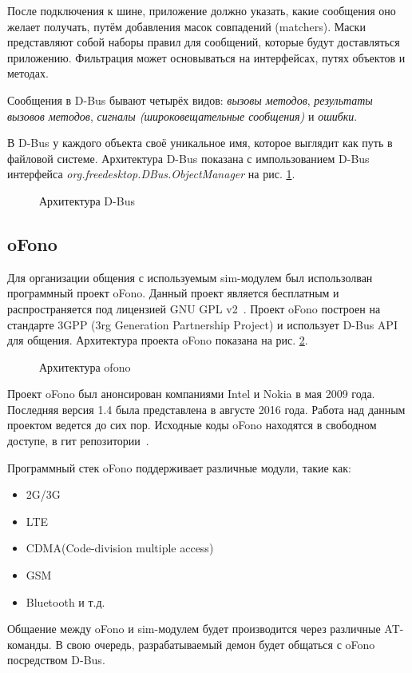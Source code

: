 После подключения к шине, приложение должно указать, какие сообщения оно желает получать, путём добавления масок совпадений (matchers). Маски представляют собой наборы правил для сообщений, которые будут доставляться приложению. Фильтрация может основываться на интерфейсах, путях объектов и методах.

Сообщения в D-Bus бывают четырёх видов: \textit{вызовы методов}, \textit{результаты вызовов методов}, \textit{сигналы (широковещательные сообщения)} и \textit{ошибки}.

В D-Bus у каждого объекта своё уникальное имя, которое выглядит как путь в файловой системе. Архитектура D-Bus показана с импользованием D-Bus интерфейса \textit{org.freedesktop.DBus.ObjectManager} на рис. \ref{fig:dbus}.
\begin{figure}[H]
\caption{Архитектура D-Bus}
\label{fig:dbus}
\end{figure}
\subsection{oFono}
Для организации общения с используемым sim-модулем был использолван программный проект oFono. Данный проект является бесплатным и распространяется под лицензией GNU GPL v2~\cite{oFono}. Проект oFono построен на стандарте 3GPP (3rg Generation Partnership Project) и использует D-Bus API для общения. Архитектура проекта oFono показана на рис. \ref{fig:ofono}.
\begin{figure}[H]
\caption{Архитектура ofono}
\label{fig:ofono}
\end{figure}

Проект oFono был анонсирован компаниями Intel и Nokia в мая 2009 года. Последняя версия 1.4 была представлена в августе 2016 года. Работа над данным проектом ведется до сих пор. Исходные коды oFono находятся в свободном доступе, в гит репозитории~\cite{oFonoSources}.

Программный стек oFono поддерживает различные модули, такие как:
\begin{itemize}
\item 2G/3G
\item LTE
\item CDMA(Code-division multiple access)
\item GSM
\item Bluetooth и т.д.
\end{itemize}

Общаение между oFono и sim-модулем будет производится через различные AT-команды. В свою очередь, разрабатываемый демон будет общаться с oFono посредством D-Bus.
